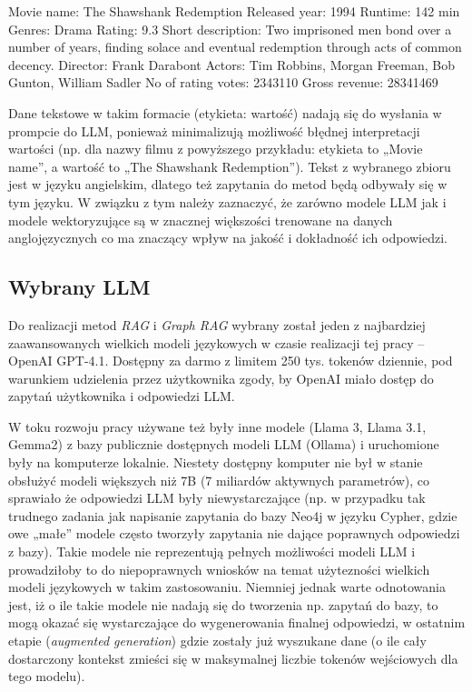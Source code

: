 \documentclass[
a4paper,
12pt,
]{article}
\begin{document}
\begin{codestyle}
Movie name: The Shawshank Redemption
Released year: 1994
Runtime: 142 min
Genres: Drama
Rating: 9.3
Short description: Two imprisoned men bond over a number of years, finding solace and eventual redemption through acts of common decency.
Director: Frank Darabont
Actors: Tim Robbins, Morgan Freeman, Bob Gunton, William Sadler
No of rating votes: 2343110
Gross revenue: 28341469
\end{codestyle}

Dane tekstowe w takim formacie (etykieta: wartość) nadają się do wysłania w prompcie do LLM, ponieważ minimalizują możliwość błędnej interpretacji wartości (np. dla nazwy filmu z powyższego przykładu: etykieta to „Movie name”, a wartość to „The Shawshank Redemption”).
Tekst z wybranego zbioru jest w języku angielskim, dlatego też zapytania do metod będą odbywały się w tym języku. W związku z tym należy zaznaczyć, że zarówno modele LLM jak i modele wektoryzujące są w znacznej większości trenowane na danych anglojęzycznych co ma znaczący wpływ na jakość i dokładność ich odpowiedzi. 

\subsection{Wybrany LLM}

Do realizacji metod \textit{RAG} i \textit{Graph RAG} wybrany został jeden z najbardziej zaawansowanych wielkich modeli językowych w czasie realizacji tej pracy -- OpenAI GPT-4.1. Dostępny za darmo z limitem 250 tys. tokenów dziennie, pod warunkiem udzielenia przez użytkownika zgody, by OpenAI miało dostęp do zapytań użytkownika i odpowiedzi LLM.

W toku rozwoju pracy używane też były inne modele (Llama 3, Llama 3.1, Gemma2) z bazy publicznie dostępnych modeli LLM (Ollama) i uruchomione były na komputerze lokalnie. Niestety dostępny komputer nie był w stanie obsłużyć modeli większych niż 7B (7 miliardów aktywnych parametrów), co sprawiało że odpowiedzi LLM były niewystarczające (np. w przypadku tak trudnego zadania jak napisanie zapytania do bazy Neo4j w języku Cypher, gdzie owe „małe” modele często tworzyły zapytania nie dające poprawnych odpowiedzi z bazy). Takie modele nie reprezentują pełnych możliwości modeli LLM i prowadziłoby to do niepoprawnych wniosków na temat użytezności wielkich modeli językowych w takim zastosowaniu. Niemniej jednak warte odnotowania jest, iż o ile takie modele nie nadają się do tworzenia np. zapytań do bazy, to mogą okazać się wystarczające do wygenerowania finalnej odpowiedzi, w ostatnim etapie (\textit{augmented generation}) gdzie zostały już wyszukane dane (o ile cały dostarczony kontekst zmieści się w maksymalnej liczbie tokenów wejściowych dla tego modelu).
\end{document}
